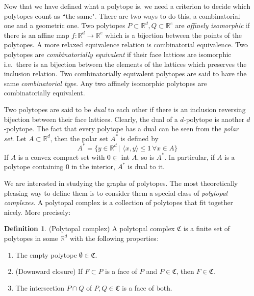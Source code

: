 \documentclass[a4paper,12pt]{book}
\theoremstyle{plain}
\theoremstyle{definition}
\newtheorem{definition}[theorem]{Definition}
\begin{document}
Now that we have defined what a polytope is, we need a criterion to decide which polytopes 
count as ``the same". There are two ways to do this, a combinatorial one and a geometric one.
Two polytopes $P\subset \mathbb{R}^d, Q \subset \mathbb{R}^e$ are 
\textit{affinely isomorphic} if there is an affine map $f: \mathbb{R}^d 
\rightarrow \mathbb{R}^e$ which is a bijection between the points of the 
polytopes. A more relaxed equivalence relation is combinatorial equivalence. Two 
polytopes are \textit{combinatorially equivalent} if their face lattices are isomorphic 
i.e.\ there is an bijection between the elements of the lattices which preserves
the inclusion relation. Two combinatorially equivalent polytopes are said to have the 
same \textit{combinatorial type}. Any two affinely isomorphic polytopes are combinatorially
equivalent.


Two polytopes are said to be \emph{dual} to each other if there is an inclusion 
reversing bijection between their face lattices. Clearly, the dual of a 
$d$-polytope is another $d$-polytope. The fact that every polytope has a dual 
can be seen from the \textit{polar set}. Let $A\subset \mathbb{R}^d$, then the 
polar set $A^*$ is defined by
\begin{equation}
 A^* = \{y \in \mathbb{R}^d \mid \langle x,y\rangle \leq 1 \, \forall  x  \in A 
\} 
\end{equation}
If $A$ is a convex compact set with $0 \in$ int $A$, so is $A^*$. In 
particular, if $A$ is a polytope containing $0$ in the interior, $A^*$ is dual 
to it. 


We are interested in studying the graphs of polytopes. The most theoretically 
pleasing way to define them is to consider them a special class of 
\textit{polytopal complexes}.
A polytopal complex is a collection of polytopes that fit together nicely.
More precisely:
\begin{definition}
 (Polytopal complex) A polytopal complex $\mathfrak{C}$ is a finite set of 
polytopes in some $\mathbb{R}^d$ with the following properties:
\begin{enumerate}
 \item The empty polytope $\emptyset \in \mathfrak{C}$.
  \item (Downward closure) If $F \subset P$ is a face of $P$ and $P \in 
\mathfrak{C}$, then 
$F \in \mathfrak{C}$.
\item The intersection $P\cap Q$ of $P,Q \in \mathfrak{C}$ is a face of both.

\end{enumerate}

\end{definition}
\end{document}
